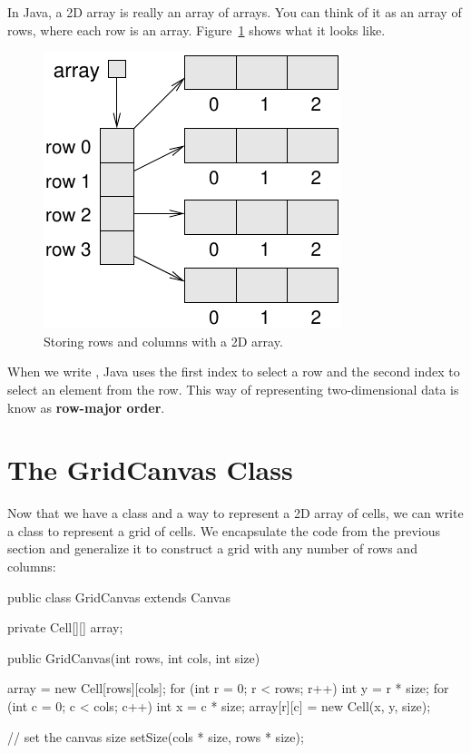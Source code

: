 In Java, a 2D array is really an array of arrays.
You can think of it as an array of rows, where each row is an array.
Figure~\ref{fig:2D-array} shows what it looks like.

\begin{figure}[!ht]
\begin{center}
\includegraphics{figs/2D-array.pdf}
\caption{Storing rows and columns with a 2D array.}
\label{fig:2D-array}
\end{center}
\end{figure}


When we write , Java uses the first index to select a row and the second index to select an element from the row.
This way of representing two-dimensional data is know as {\bf row-major order}.


\section{The GridCanvas Class}

Now that we have a  class and a way to represent a 2D array of cells, we can write a class to represent a grid of cells.
We encapsulate the code from the previous section and generalize it to construct a grid with any number of rows and columns:

\begin{code}
public class GridCanvas extends Canvas {
    private Cell[][] array;

    public GridCanvas(int rows, int cols, int size) {
        array = new Cell[rows][cols];
        for (int r = 0; r < rows; r++) {
            int y = r * size;
            for (int c = 0; c < cols; c++) {
                int x = c * size;
                array[r][c] = new Cell(x, y, size);
            }
        }

        // set the canvas size
        setSize(cols * size, rows * size);
    }
}
\end{code}

